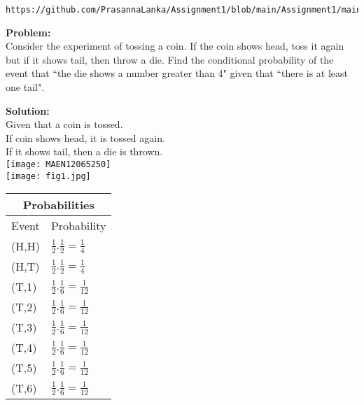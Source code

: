\documentclass[journal,12pt,twocolumn]{IEEEtran}
\begin{document}
\maketitle
\newpage
\bigskip
{} 
\begin{lstlisting}
https://github.com/PrasannaLanka/Assignment1/blob/main/Assignment1/main.tex
\end{lstlisting}
\item{\textbf{Problem:}}
\\
Consider the experiment of tossing a coin. If the coin shows head, toss it again but if it shows tail, then throw a die. Find the conditional probability of the event that ``the die shows a number greater than 4" given that ``there is at least one tail".
\item{\textbf{Solution:}}
\\
Given that a coin is tossed.
\\If coin shows head, it is tossed again.
\\If it shows tail, then a die is thrown.
\\
\texttt{[image: MAEN12065250]}
\\
\texttt{[image: fig1.jpg]}


\setlength{\arrayrulewidth}{1mm}
\setlength{\tabcolsep}{10pt}
\renewcommand{\arraystretch}{2}
{
\begin{tabular}{ |p{3cm}|p{3cm}|  }
\hline
\multicolumn{2}{|c|}{Probabilities } \\
\hline
Event &  Probability\\
\hline
(H,H) & $\frac{1}{2}.\frac{1}{2}=\frac{1}{4}$\\
(H,T) & $\frac{1}{2}.\frac{1}{2}=\frac{1}{4}$\\
(T,1) & $\frac{1}{2}.\frac{1}{6}=\frac{1}{12}$\\
(T,2) & $\frac{1}{2}.\frac{1}{6}=\frac{1}{12}$\\
(T,3) & $\frac{1}{2}.\frac{1}{6}=\frac{1}{12}$\\
(T,4) & $\frac{1}{2}.\frac{1}{6}=\frac{1}{12}$\\
(T,5) & $\frac{1}{2}.\frac{1}{6}=\frac{1}{12}$\\
(T,6) & $\frac{1}{2}.\frac{1}{6}=\frac{1}{12}$\\
\hline
\end{tabular}
}
\\\\
\end{document}
